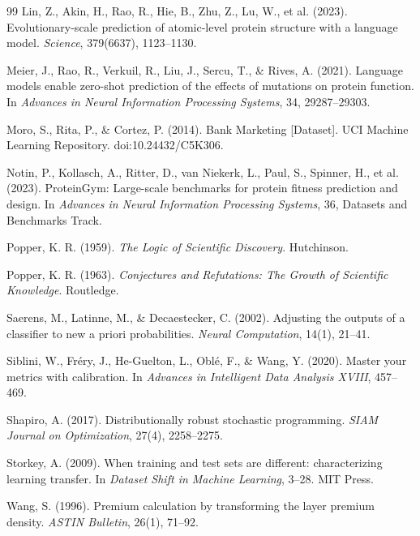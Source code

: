 \documentclass[11pt]{article}
\theoremstyle{remark}
\begin{document}
\begin{thebibliography}{99}
Lin, Z., Akin, H., Rao, R., Hie, B., Zhu, Z., Lu, W., et al. (2023).
Evolutionary-scale prediction of atomic-level protein structure with a language model.
\emph{Science}, 379(6637), 1123--1130.

Meier, J., Rao, R., Verkuil, R., Liu, J., Sercu, T., \& Rives, A. (2021).
Language models enable zero-shot prediction of the effects of mutations on protein function.
In \emph{Advances in Neural Information Processing Systems}, 34, 29287--29303.

Moro, S., Rita, P., \& Cortez, P. (2014).
Bank Marketing [Dataset].
UCI Machine Learning Repository. doi:10.24432/C5K306.

Notin, P., Kollasch, A., Ritter, D., van Niekerk, L., Paul, S., Spinner, H., et al. (2023).
ProteinGym: Large-scale benchmarks for protein fitness prediction and design.
In \emph{Advances in Neural Information Processing Systems}, 36, Datasets and Benchmarks Track.

Popper, K. R. (1959).
\emph{The Logic of Scientific Discovery}.
Hutchinson.

Popper, K. R. (1963).
\emph{Conjectures and Refutations: The Growth of Scientific Knowledge}.
Routledge.

Saerens, M., Latinne, M., \& Decaestecker, C. (2002).
Adjusting the outputs of a classifier to new a priori probabilities.
\emph{Neural Computation}, 14(1), 21--41.

Siblini, W., Fr\'ery, J., He-Guelton, L., Obl\'e, F., \& Wang, Y. (2020).
Master your metrics with calibration.
In \emph{Advances in Intelligent Data Analysis XVIII}, 457--469.

Shapiro, A. (2017).
Distributionally robust stochastic programming.
\emph{SIAM Journal on Optimization}, 27(4), 2258--2275.

Storkey, A. (2009).
When training and test sets are different: characterizing learning transfer.
In \emph{Dataset Shift in Machine Learning}, 3--28. MIT Press.

Wang, S. (1996).
Premium calculation by transforming the layer premium density.
\emph{ASTIN Bulletin}, 26(1), 71--92.

\end{thebibliography}
\end{document}
